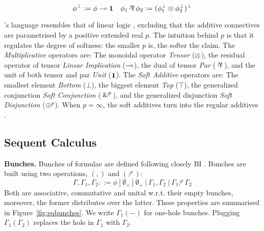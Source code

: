 $$\ldual{\phi} := \phi \ediv{} \unit \quad \phi_1 \dismul{} \phi_2 := \ldual{(\ldual{\phi_1} \conmul{} \ldual{\phi_2})}$$

\OL{}'s language resembles that of linear logic \citep{Wadler1993, agliano2025algebraic}, excluding that the additive connectives are parametrised by a positive extended real $p$. The intuition behind $p$ is that it regulates the degree of softness: the smaller $p$ is, the softer the claim.
The \emph{Multiplicative} operators are: The monoidal operator \emph{Tensor} ($\otimes{}$), the residual operator of tensor \emph{Linear Implication} ($\multimap$), the dual of tensor \emph{Par} ($\dismul{}$), and the unit of both tensor and par \emph{Unit} ($\textbf{1}$). The \emph{Soft Additive} operators are: The smallest element \emph{Bottom} ($\bot$), the biggest element \emph{Top} ($\top$), the generalized conjunction \emph{Soft Conjunction} ($\,\&^{p}\,$), and the generalized disjunction \emph{Soft Disjunction} ($\oplus^{p}$). When $p = \infty$, the soft additives turn into the regular additives \citep{galatos2007residuated}.

\subsection{Sequent Calculus}

\textbf{Bunches.}
Bunches of formulae are defined following closely BI \cite{o1999logic}. Bunches are built using two operations, $(,)$ and $(;^p)$:
$$\Gamma, \Gamma_1, \Gamma_2 ::= \phi \ | \ 
\emptyset_{\times} \ | \ \emptyset_{+} \ 
|  \ \Gamma_1, \Gamma_2 \ | \ \Gamma_1;^p \Gamma_2 $$
Both are associative, commutative and unital w.r.t. their empty 
bunches, moreover, the former distributes over the latter.  These properties are summarised in Figure~\ref{fig:eqbunches}.  We write $\Gamma_{1}(-)$ for one-hole bunches. Plugging $\Gamma_{1}(\Gamma_{2})$ replaces the hole in $\Gamma_{1}$ with $\Gamma_{2}$.

